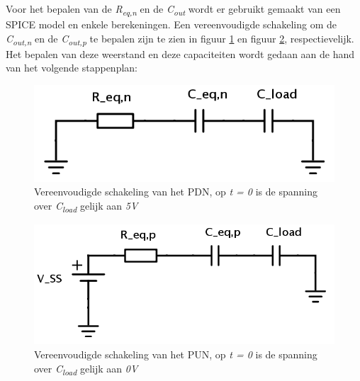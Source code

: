 \documentclass{article}
\begin{document}
\newcommand{\tss}{\textsubscript}
\newcommand{\tsss}{\textsuperscript}


Voor het bepalen van de \emph{R\tss{eq,n}} en de \emph{C\tss{out}} wordt er gebruikt gemaakt van een SPICE model en enkele berekeningen. Een vereenvoudigde schakeling om de \emph{C\tss{out,n}} en de \emph{C\tss{out,p}} te bepalen zijn te zien in figuur \ref{res:PDN_schematic} en figuur \ref{res:PUN_schematic}, respectievelijk. Het bepalen van deze weerstand en deze capaciteiten wordt gedaan aan de hand van het volgende stappenplan:

 \begin{figure} [h!]
 \begin{center}
 \includegraphics [scale = 0.5] {figures/PDN_schematic}
 \caption{Vereenvoudigde schakeling van het PDN, op \emph{t = 0} is de spanning over \emph{C\tss{load}} gelijk aan \emph{5V}}
 \label{res:PDN_schematic}
 \end{center}
 \end{figure}

 \begin{figure} [h!]
 \begin{center}
 \includegraphics [scale = 0.5] {figures/PUN_schematic}
 \caption{Vereenvoudigde schakeling van het PUN, op \emph{t = 0} is de spanning over \emph{C\tss{load}} gelijk aan \emph{0V}}
 \label{res:PUN_schematic}
 \end{center}
 \end{figure}
\end{document}
